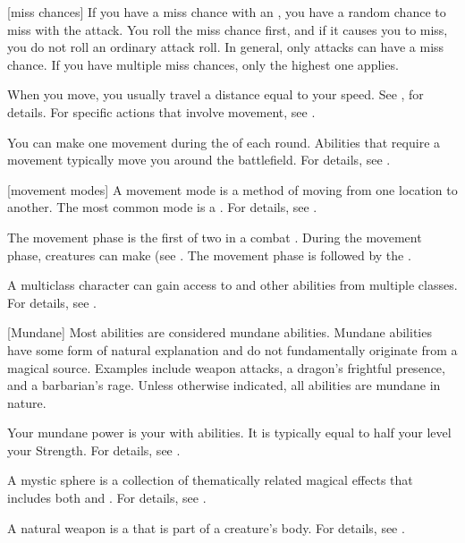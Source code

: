 [miss chances] If you have a miss chance with an , you have a random chance to miss with the attack.
You roll the miss chance first, and if it causes you to miss, you do not roll an ordinary attack roll.
In general, only  attacks can have a miss chance.
If you have multiple miss chances, only the highest one applies.

 When you move, you usually travel a distance equal to your speed.
See , for details.
For specific actions that involve movement, see .

 You can make one movement during the  of each round.
Abilities that require a movement typically move you around the battlefield.
For details, see .

[movement modes] A movement mode is a method of moving from one location to another.
The most common mode is a .
For details, see .

 The movement phase is the first of two  in a combat .
During the movement phase, creatures can make  (see .
The movement phase is followed by the .

 A multiclass character can gain access to  and other abilities from multiple classes.
For details, see .

[Mundane] Most abilities are considered mundane abilities.
Mundane abilities have some form of natural explanation and do not fundamentally originate from a magical source.
Examples include weapon attacks, a dragon's frightful presence, and a barbarian's rage.
Unless otherwise indicated, all abilities are mundane in nature.

 Your mundane power is your  with  abilities.
It is typically equal to half your level \add your Strength.
For details, see .

 A mystic sphere is a collection of thematically related magical effects that includes both  and .
For details, see .

 A natural weapon is a  that is part of a creature's body.
For details, see .

